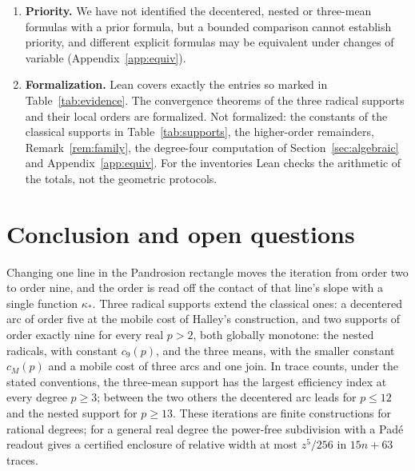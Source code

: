 \begin{enumerate}[label=\arabic*.]
  analysed.
\item \textbf{Priority.} We have not identified the decentered, nested or three-mean formulas with a prior formula,
  but a bounded comparison cannot establish priority, and different explicit formulas may be equivalent under changes of variable
  (Appendix~\ref{app:equiv}).
\item \textbf{Formalization.} Lean covers exactly the entries so marked in Table~\ref{tab:evidence}.
  The convergence theorems of the three radical supports and their local orders are formalized. Not
  formalized: the constants of the classical supports in Table~\ref{tab:supports}, the higher-order
  remainders, Remark~\ref{rem:family}, the degree-four computation of Section~\ref{sec:algebraic} and
  Appendix~\ref{app:equiv}. For the inventories Lean checks
  the arithmetic of the totals, not the geometric protocols.
\end{enumerate}

\section{Conclusion and open questions}\label{sec:conclusion}

Changing one line in the Pandrosion rectangle moves the iteration from order two to order nine, and the
order is read off the contact of that line's slope with a single function $\kappa_*$. Three radical
supports extend the classical ones: a decentered arc of order five at the mobile cost of Halley's
construction, and two supports of order exactly nine for every real $p>2$, both globally monotone: the
nested radicals, with constant $c_9(p)$, and the three means, with the smaller constant $c_M(p)$ and a
mobile cost of three arcs and one join. In trace counts, under the stated conventions, the three-mean
support has the largest efficiency index at every degree $p\ge3$; between the two others the decentered
arc leads for $p\le12$ and the nested support for $p\ge13$. These iterations are finite constructions
for rational degrees; for a general real degree the power-free subdivision with a Pad\'e readout gives a
certified enclosure of relative width at most $z^{5}/256$ in $15n+63$ traces.

